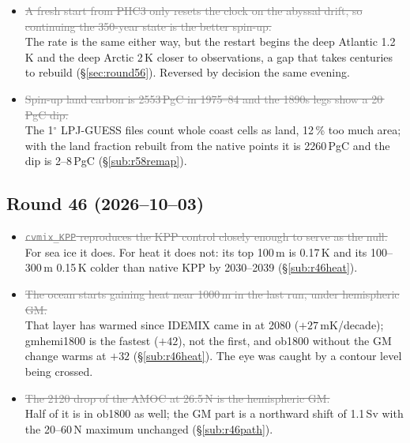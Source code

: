 \documentclass[10pt]{article}
\newcommand{\dead}[1]{\textcolor{gray}{\sout{#1}}}
\begin{document}
\begin{itemize}
\item \dead{A fresh start from PHC3 only resets the clock on the abyssal drift, so continuing the
      350-year state is the better spin-up.} \\ The rate is the same either way, but the restart begins
      the deep Atlantic 1.2\,K and the deep Arctic 2\,K closer to observations, a gap that takes
      centuries to rebuild (\S\ref{sec:round56}). Reversed by decision the same evening.

\item \dead{Spin-up land carbon is 2553\,PgC in 1975--84 and the 1890s legs show a 20\,PgC dip.} \\ The
      1$^\circ$ LPJ-GUESS files count whole coast cells as land, 12\,\% too much area; with the land
      fraction rebuilt from the native points it is 2260\,PgC and the dip is 2--8\,PgC
      (\S\ref{sub:r58remap}).

\end{itemize}

\subsection{Round 46 (2026--10--03)}\label{sub:fals46}

\begin{itemize}

\item \dead{\texttt{cvmix\_KPP} reproduces the KPP control closely enough to serve as the null.} \\
      For sea ice it does. For heat it does not: its top 100\,m is 0.17\,K and its 100--300\,m
      0.15\,K colder than native KPP by 2030--2039 (\S\ref{sub:r46heat}).

\item \dead{The ocean starts gaining heat near 1000\,m in the last run, under hemispheric GM.} \\
      That layer has warmed since IDEMIX came in at 2080 ($+27$\,mK/decade); gmhemi1800 is the
      fastest ($+42$), not the first, and ob1800 without the GM change warms at $+32$
      (\S\ref{sub:r46heat}). The eye was caught by a contour level being crossed.

\item \dead{The 2120 drop of the AMOC at 26.5\,N is the hemispheric GM.} \\
      Half of it is in ob1800 as well; the GM part is a northward shift of 1.1\,Sv with the
      20--60\,N maximum unchanged (\S\ref{sub:r46path}).

\end{itemize}
\end{document}
